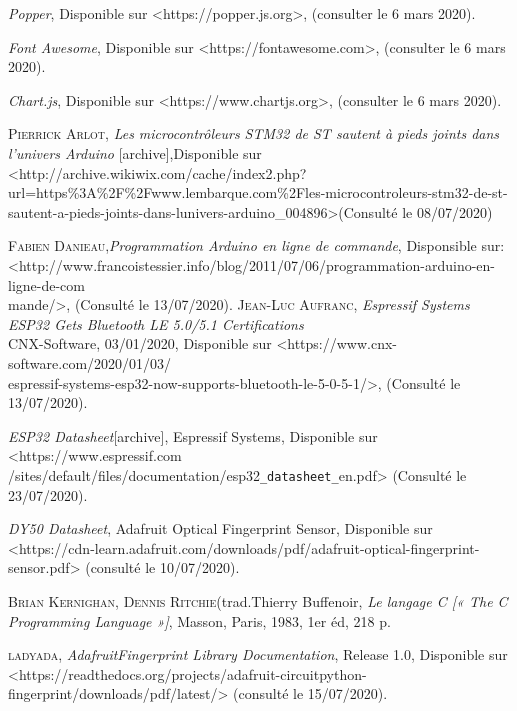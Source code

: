 \begin{thebibliography}{2}
         \emph{Popper}, Disponible sur <https://popper.js.org>, (consulter le 6 mars 2020).
        
         \emph{Font Awesome}, Disponible sur <https://fontawesome.com>, (consulter le 6 mars 2020).
        
         \emph{Chart.js}, Disponible sur <https://www.chartjs.org>, (consulter le 6 mars 2020).
    
         \textsc{Pierrick Arlot}, \emph {Les microcontrôleurs STM32 de ST sautent à pieds joints dans l’univers Arduino }[archive],Disponible sur <http://archive.wikiwix.com/cache/index2.php?url=https\%3A\%2F\%2Fwww.lembarque.com\%2Fles-microcontroleurs-stm32-de-st-sautent-a-pieds-joints-dans-lunivers-arduino\_004896>(Consulté le 08/07/2020)

         \textsc{Fabien Danieau},\emph{Programmation Arduino en ligne de commande}, Disponsible sur: \\<http://www.francoistessier.info/blog/2011/07/06/programmation-arduino-en-ligne-de-com\\mande/>, (Consulté le 13/07/2020).
          \textsc{Jean-Luc Aufranc}, \emph{Espressif Systems ESP32 Gets Bluetooth LE 5.0/5.1 Certifications}\\ CNX-Software, 03/01/2020, Disponible sur <https://www.cnx-software.com/2020/01/03/\\espressif-systems-esp32-now-supports-bluetooth-le-5-0-5-1/>, (Consulté le 13/07/2020).
       
         \emph{ESP32 Datasheet}[archive], Espressif Systems, Disponible sur <https://www.espressif.com\\/sites/default/files/documentation/esp32\texttt{_datasheet_}en.pdf> (Consulté le  23/07/2020).
        
         \emph{DY50 Datasheet}, Adafruit Optical Fingerprint Sensor, Disponible sur <https://cdn-learn.adafruit.com/downloads/pdf/adafruit-optical-fingerprint-sensor.pdf> (consulté le 10/07/2020).
     

         \textsc{Brian Kernighan}, \textsc{Dennis Ritchie}(trad.Thierry Buffenoir, \emph{Le langage C [« The C Programming Language »]}, Masson, Paris, 1983, 1er éd, 218 p.
        
         \textsc{ladyada}, \emph{AdafruitFingerprint Library Documentation}, Release 1.0, Disponible sur \\<https://readthedocs.org/projects/adafruit-circuitpython-fingerprint/downloads/pdf/latest/> (consulté le 15/07/2020).
        

\end{thebibliography}
